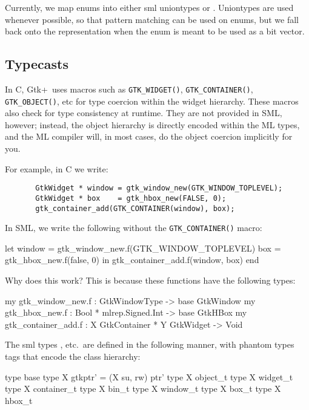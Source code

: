 \documentclass{article}
\newcommand{\gtk}{\mbox{\sf Gtk+}}
\begin{document}
    Currently, we map enums into either sml uniontypes or 
.   Uniontypes are used whenever possible, so that
pattern matching can be used on enums, but we fall back onto the 
 representation when the enum is meant to be used as a 
bit vector.
 
\subsection{Typecasts}
   In C, \gtk\ uses macros such as \verb|GTK_WIDGET()|, 
    \verb|GTK_CONTAINER()|, \verb|GTK_OBJECT()|,
   etc for type coercion within the widget hierarchy.  
   These macros also check for type consistency at runtime.   
   They are not provided in SML, however; instead, the object hierarchy 
   is directly encoded within the ML types, and the ML compiler will,
   in most cases, do the object coercion implicitly for you.

   For example, in C we write:
  \begin{verbatim}
       GtkWidget * window = gtk_window_new(GTK_WINDOW_TOPLEVEL);
       GtkWidget * box    = gtk_hbox_new(FALSE, 0);
       gtk_container_add(GTK_CONTAINER(window), box);
  \end{verbatim}

   In SML, we write the following without the \verb|GTK_CONTAINER()| macro:

  \begin{smldisp}
       let 
           window = gtk_window_new.f(GTK_WINDOW_TOPLEVEL)
           box    = gtk_hbox_new.f(false, 0)
       in  
           gtk_container_add.f(window, box)
       end
  \end{smldisp}

   Why does this work?  This is because these functions have the following
   types:

   \begin{smldisp}
       my gtk_window_new.f    : GtkWindowType -> base GtkWindow
       my gtk_hbox_new.f      : Bool * mlrep.Signed.Int -> base GtkHBox
       my gtk_container_add.f : X GtkContainer * Y GtkWidget -> Void
   \end{smldisp}

   The sml types ,  etc.~are 
defined in the following manner, with phantom types tags that
encode the class hierarchy:

    \begin{smldisp}
       type base
       type X gtkptr' = (X su, rw) ptr'
       type X object_t
       type X widget_t
       type X container_t
       type X bin_t
       type X window_t
       type X box_t
       type X hbox_t
    \end{smldisp}
\end{document}
